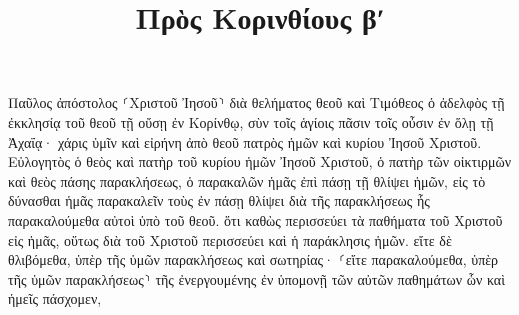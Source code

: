 \documentclass{openreader}
\title{Πρὸς Κορινθίους βʹ}
\date{}
\begin{document}
\maketitle
\raggedbottom 
\fontsize{16pt}{24pt}\selectfont


Παῦλος ἀπόστολος ⸂Χριστοῦ Ἰησοῦ⸃ διὰ θελήματος θεοῦ καὶ Τιμόθεος ὁ ἀδελφὸς τῇ ἐκκλησίᾳ τοῦ θεοῦ τῇ οὔσῃ ἐν Κορίνθῳ, σὺν τοῖς ἁγίοις πᾶσιν τοῖς οὖσιν ἐν ὅλῃ τῇ Ἀχαΐᾳ· 
χάρις ὑμῖν καὶ εἰρήνη ἀπὸ θεοῦ πατρὸς ἡμῶν καὶ κυρίου Ἰησοῦ Χριστοῦ. 
Εὐλογητὸς ὁ θεὸς καὶ πατὴρ τοῦ κυρίου ἡμῶν Ἰησοῦ Χριστοῦ, ὁ πατὴρ τῶν οἰκτιρμῶν καὶ θεὸς πάσης παρακλήσεως, 
ὁ παρακαλῶν ἡμᾶς ἐπὶ πάσῃ τῇ θλίψει ἡμῶν, εἰς τὸ δύνασθαι ἡμᾶς παρακαλεῖν τοὺς ἐν πάσῃ θλίψει διὰ τῆς παρακλήσεως ἧς παρακαλούμεθα αὐτοὶ ὑπὸ τοῦ θεοῦ. 
ὅτι καθὼς περισσεύει τὰ παθήματα τοῦ Χριστοῦ εἰς ἡμᾶς, οὕτως διὰ τοῦ Χριστοῦ περισσεύει καὶ ἡ παράκλησις ἡμῶν. 
εἴτε δὲ θλιβόμεθα, ὑπὲρ τῆς ὑμῶν παρακλήσεως καὶ σωτηρίας· ⸂εἴτε παρακαλούμεθα, ὑπὲρ τῆς ὑμῶν παρακλήσεως⸃ τῆς ἐνεργουμένης ἐν ὑπομονῇ τῶν αὐτῶν παθημάτων ὧν καὶ ἡμεῖς πάσχομεν, 
\end{document}

